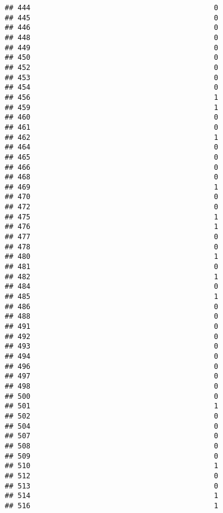 \documentclass[
]{article}
\begin{document}
\begin{verbatim}
## 444                                           0
## 445                                           0
## 446                                           0
## 448                                           0
## 449                                           0
## 450                                           0
## 452                                           0
## 453                                           0
## 454                                           0
## 456                                           1
## 459                                           1
## 460                                           0
## 461                                           0
## 462                                           1
## 464                                           0
## 465                                           0
## 466                                           0
## 468                                           0
## 469                                           1
## 470                                           0
## 472                                           0
## 475                                           1
## 476                                           1
## 477                                           0
## 478                                           0
## 480                                           1
## 481                                           0
## 482                                           1
## 484                                           0
## 485                                           1
## 486                                           0
## 488                                           0
## 491                                           0
## 492                                           0
## 493                                           0
## 494                                           0
## 496                                           0
## 497                                           0
## 498                                           0
## 500                                           0
## 501                                           1
## 502                                           0
## 504                                           0
## 507                                           0
## 508                                           0
## 509                                           0
## 510                                           1
## 512                                           0
## 513                                           0
## 514                                           1
## 516                                           1

\end{verbatim}
\end{document}
